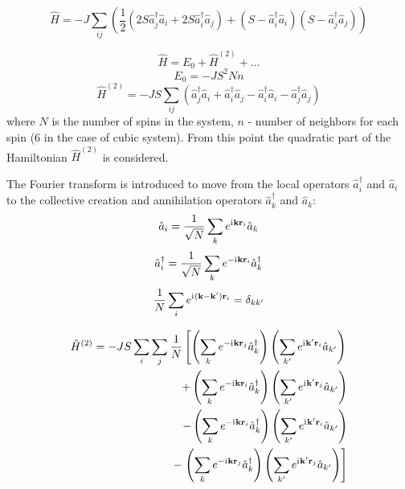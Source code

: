 \begin{equation}
    \hat{H} = -J \sum_{ij} \left(\dfrac{1}{2}\left(
        2S\hat{a}_j^{\dag}\hat{a}_i + 2S\hat{a}_i^{\dag}\hat{a}_j\right) + 
        \left(S - \hat{a}_i^{\dag}\hat{a}_i\right)\left(S - \hat{a}_j^{\dag}\hat{a}_j\right)\right)
\end{equation}

\begin{equation}
    \hat{H} = E_0 + \hat{H}^{(2)} + \dots 
\end{equation}
\begin{equation}
    E_0 = -JS^2Nn \label{eq:zero-energy}
\end{equation}
\begin{equation}
    \hat{H}^{(2)} = -JS \sum_{ij} \left(\hat{a}_j^{\dag}\hat{a}_i + \hat{a}_i^{\dag}\hat{a}_j - 
    \hat{a}_i^{\dag}\hat{a}_i - \hat{a}_j^{\dag}\hat{a}_j\right)
    \label{eq:quadratic-ham}
\end{equation}
where $N$ is the number of spins in the system, $n$ - number of neighbors for each spin ($6$ in the case of cubic system).
From this point the quadratic part of the Hamiltonian $\hat{H}^{(2)}$ is considered.

The Fourier transform is introduced to move from the local operators $\hat{a}_i^{\dag}$ and $\hat{a}_i$
to the collective creation and annihilation operators $\hat{a}_k^{\dag}$ and $\hat{a}_k$:
\begin{equation}
    \hat{a}_i = \dfrac{1}{\sqrt{N}}\sum_k e^{\mathrm{i}\mkern1mu\mathbf{k}\mathbf{r}_i} \hat{a}_k 
\end{equation}
\begin{equation}
    \hat{a}_i^{\dag} = \dfrac{1}{\sqrt{N}}\sum_k e^{-\mathrm{i}\mkern1mu\mathbf{k}\mathbf{r}_i} \hat{a}_k^{\dag} 
\end{equation}
\begin{equation}
    \dfrac{1}{N}\sum_i e^{\mathrm{i}\mkern1mu(\mathbf{k} - \mathbf{k}^{\prime})\mathbf{r}_i} = \delta_{kk^{\prime}} 
\end{equation}

\begin{equation}
\begin{aligned}
    \hat{H}^{(2)}  = -JS \sum_i\sum_j \dfrac{1}{N}\left[
        \left(\sum_k e^{-\mathrm{i}\mkern1mu\mathbf{k}\mathbf{r}_j} \hat{a}_k^{\dag}\right)
        \left(\sum_{k^{\prime}} e^{\mathrm{i}\mkern1mu\mathbf{k^{\prime}}\mathbf{r}_i} \hat{a}_{k^{\prime}}\right)\right. \\
        +
        \left(\sum_k e^{-\mathrm{i}\mkern1mu\mathbf{k}\mathbf{r}_i} \hat{a}_k^{\dag}\right)
        \left(\sum_{k^{\prime}} e^{\mathrm{i}\mkern1mu\mathbf{k^{\prime}}\mathbf{r}_j} \hat{a}_{k^{\prime}}\right)  \\
        -
        \left(\sum_k e^{-\mathrm{i}\mkern1mu\mathbf{k}\mathbf{r}_i} \hat{a}_k^{\dag}\right)
        \left(\sum_{k^{\prime}} e^{\mathrm{i}\mkern1mu\mathbf{k^{\prime}}\mathbf{r}_i} \hat{a}_{k^{\prime}}\right)  \\
        -
        \left.\left(\sum_k e^{-\mathrm{i}\mkern1mu\mathbf{k}\mathbf{r}_j} \hat{a}_k^{\dag}\right)
        \left(\sum_{k^{\prime}} e^{\mathrm{i}\mkern1mu\mathbf{k^{\prime}}\mathbf{r}_j} \hat{a}_{k^{\prime}}\right) \right]
\end{aligned}
\end{equation}

